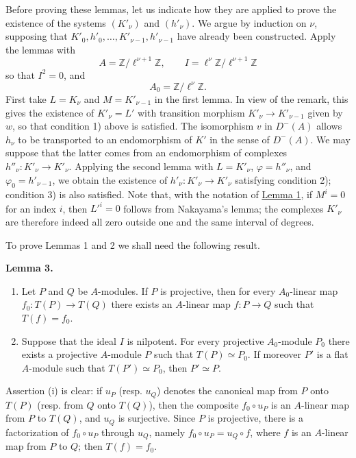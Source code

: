 \documentclass[11pt]{article}
\newenvironment{statement}[1]{\par\medskip\noindent\textbf{#1.}\ }{\par\medskip}
\begin{document}
Before proving these lemmas, let us indicate how they are applied to prove the existence of the systems $(K'_\nu)$ and $(h'_\nu)$. We argue by induction on $\nu$, supposing that $K'_0,h'_0,\ldots,K'_{\nu-1},h'_{\nu-1}$ have already been constructed. Apply the lemmas with
\[
A=\mathbb Z/\ell^{\nu+1}\mathbb Z,
\qquad
I=\ell^\nu\mathbb Z/\ell^{\nu+1}\mathbb Z
\]
so that $I^2=0$, and
\[
A_0=\mathbb Z/\ell^\nu\mathbb Z.
\]
First take $L=K_\nu$ and $M=K'_{\nu-1}$ in the first lemma. In view of the remark, this gives the existence of $K'_\nu=L'$ with transition morphism $K'_\nu\to K'_{\nu-1}$ given by $w$, so that condition 1) above is satisfied. The isomorphism $v$ in $D^-(A)$ allows $h_\nu$ to be transported to an endomorphism of $K'$ in the sense of $D^-(A)$. We may suppose that the latter comes from an endomorphism of complexes $h''_\nu:K'_\nu\to K'_\nu$. Applying the second lemma with $L=K'_\nu$, $\varphi=h''_\nu$, and $\varphi_0=h'_{\nu-1}$, we obtain the existence of $h'_\nu:K'_\nu\to K'_\nu$ satisfying condition 2); condition 3) is also satisfied. Note that, with the notation of \hyperref[sga5:XV:lemma:1:2]{Lemma 1}, if $M^i=0$ for an index $i$, then $L'^i=0$ follows from Nakayama's lemma; the complexes $K'_\nu$ are therefore indeed all zero outside one and the same interval of degrees.

To prove Lemmas 1 and 2 we shall need the following result.

\label{sga5:XV:lemma:3:2}\begin{statement}{Lemma 3}
\begin{enumerate}[label=(\roman*)]
\item Let $P$ and $Q$ be $A$-modules. If $P$ is projective, then for every $A_0$-linear map $f_0:T(P)\to T(Q)$ there exists an $A$-linear map $f:P\to Q$ such that $T(f)=f_0$.
\item Suppose that the ideal $I$ is nilpotent. For every projective $A_0$-module $P_0$ there exists a projective $A$-module $P$ such that $T(P)\simeq P_0$. If moreover $P'$ is a flat $A$-module such that $T(P')\simeq P_0$, then $P'\simeq P$.
\end{enumerate}
\end{statement}

Assertion (i) is clear: if $u_P$ (resp. $u_Q$) denotes the canonical map from $P$ onto $T(P)$ (resp. from $Q$ onto $T(Q)$), then the composite $f_0\circ u_P$ is an $A$-linear map from $P$ to $T(Q)$, and $u_Q$ is surjective. Since $P$ is projective, there is a factorization of $f_0\circ u_P$ through $u_Q$, namely $f_0\circ u_P=u_Q\circ f$, where $f$ is an $A$-linear map from $P$ to $Q$; then $T(f)=f_0$.
\end{document}
